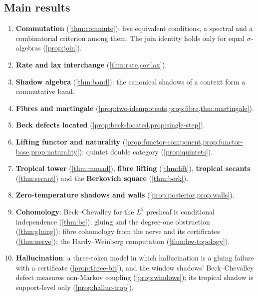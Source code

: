 \documentclass[11pt]{article}
\theoremstyle{definition}
\begin{document}
\subsection{Main results}
\begin{enumerate}[label=(\Alph*)]
\item \textbf{Commutation} (\cref{thm:commute}): five equivalent conditions, a spectral and a combinatorial criterion among them.
  The join identity holds only for equal $\sigma$-algebras (\cref{prop:join}).
\item \textbf{Rate and lax interchange} (\cref{thm:rate,cor:lax}).
\item \textbf{Shadow algebra} (\cref{thm:band}): the canonical shadows of a context form a commutative band.
\item \textbf{Fibres and martingale} (\cref{prop:two-idempotents,prop:fibre,thm:martingale}).
\item \textbf{Beck defects located} (\cref{prop:beck-located,prop:single-step}).
\item \textbf{Lifting functor and naturality} (\cref{prop:functor-component,prop:functor-base,prop:naturality}); quintet double
  category (\cref{prop:quintets}).
\item \textbf{Tropical tower} (\cref{thm:monad}), \textbf{fibre lifting} (\cref{thm:lift}), \textbf{tropical secants}
  (\cref{thm:secant}) and the \textbf{Berkovich square} (\cref{thm:berk}).
\item \textbf{Zero-temperature shadows and walls} (\cref{prop:posterior,prop:walls}).
\item \textbf{Cohomology}: Beck--Chevalley for the $L^2$ presheaf is conditional independence (\cref{thm:bc}); gluing and the
  degree-one obstruction (\cref{thm:gluing}); fibre cohomology from the nerve and its certificates (\cref{thm:nerve}); the
  Hardy--Weinberg computation (\cref{thm:hw-topology}).
\item \textbf{Hallucination}: a three-token model in which hallucination is a gluing failure with a certificate
  (\cref{prop:three-bit}), and the window shadows' Beck--Chevalley defect measures non-Markov coupling (\cref{prop:windows}); its
  tropical shadow is support-level only (\cref{prop:halluc-trop}).
\end{enumerate}
\end{document}
